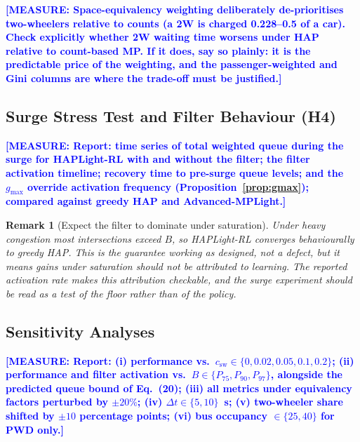 \documentclass[journal]{IEEEtran}
\newtheorem{remark}{Remark}
\newcommand{\note}[1]{\textcolor{blue}{\textbf{[MEASURE: #1]}}}
\begin{document}
\note{Space-equivalency weighting deliberately de-prioritises
two-wheelers relative to counts (a 2W is charged 0.228--0.5 of a car).
Check explicitly whether 2W waiting time worsens under HAP relative to
count-based MP. If it does, say so plainly: it is the predictable price
of the weighting, and the passenger-weighted and Gini columns are where
the trade-off must be justified.}

\subsection{Surge Stress Test and Filter Behaviour (H4)}
\label{subsec:surge}
\note{Report: time series of total weighted queue during the surge for
HAPLight-RL with and without the filter; the filter activation timeline;
recovery time to pre-surge queue levels; and the $g_{\max}$ override
activation frequency (Proposition~\ref{prop:gmax}); compared against
greedy HAP and Advanced-MPLight.}

\begin{remark}[Expect the filter to dominate under saturation]
\label{rem:filterdominates}
Under heavy congestion most intersections exceed $B$, so HAPLight-RL
converges behaviourally to greedy HAP. This is the guarantee working as
designed, not a defect, but it means gains under saturation should
\emph{not} be attributed to learning. The reported activation rate makes
this attribution checkable, and the surge experiment should be read as a
test of the floor rather than of the policy.
\end{remark}

\subsection{Sensitivity Analyses}
\label{subsec:sensitivity}
\note{Report: (i) performance vs.\
$c_{\mathrm{sw}}\in\{0,0.02,0.05,0.1,0.2\}$; (ii) performance and filter
activation vs.\ $B\in\{P_{75},P_{90},P_{97}\}$, alongside the predicted
queue bound of Eq.~(20); (iii) all metrics under equivalency factors
perturbed by $\pm20\%$; (iv) $\Delta t\in\{5,10\}$~s; (v) two-wheeler
share shifted by $\pm10$ percentage points; (vi) bus occupancy
$\in\{25,40\}$ for PWD only.}
\end{document}
